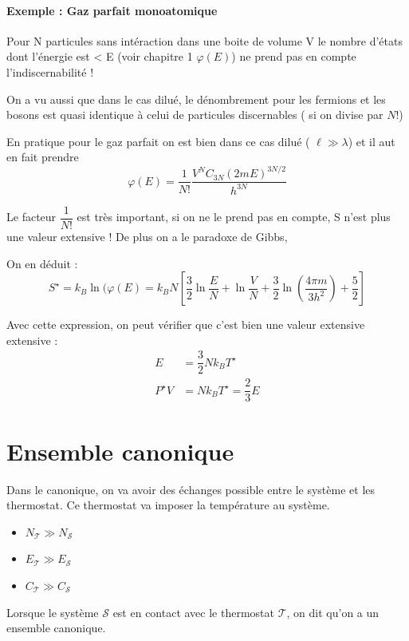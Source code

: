 \documentclass[12pt,a4paper]{report}
\begin{document}
\subsubsection{Exemple : Gaz parfait monoatomique}

Pour N particules sans intéraction dans une boite de volume V le nombre d'états dont l'énergie est < E (voir chapitre 1 $ \varphi (E) $) ne prend pas en compte l'indiscernabilité !

On a vu aussi que dans le cas dilué, le dénombrement pour les fermions et les bosons est quasi identique à celui de particules discernables ( si on divise par $ N!$)

En pratique pour le gaz parfait on est bien dans ce cas dilué ( $ \ell \gg \lambda $) et il aut en fait prendre 
\[
	\varphi (E) = \dfrac{1}{N!}\dfrac{V^N C_{3N} (2 m E)^{3N/2}  }{h^{3N}}
\]

Le facteur $\dfrac{1}{N!}$ est très important, si on ne le prend pas en compte, S n'est plus une valeur extensive ! De plus on a le paradoxe de Gibbs,

On en déduit :
\[
	S^\star = k_B \ln(\varphi(E) = k_B N \left[ \dfrac{3}{2} \ln\dfrac{E}{N} + \ln \dfrac{V}{N} + \dfrac{3}{2} \ln \left( \dfrac{4\pi m}{3h^2} \right) + \dfrac{5}{2} \right]
\]

Avec cette expression, on peut vérifier que c'est bien une valeur extensive extensive :
\begin{align*}
	E &= \dfrac{3}{2} N k_B T^\star\\
	P^\star V &= N k_B T^\star = \dfrac{2}{3} E
\end{align*}

\chapter{Ensemble canonique}

Dans le canonique, on va avoir des échanges possible entre le système et les thermostat. Ce thermostat va imposer la température au système.

\begin{itemize}
	\item $N_\mathcal{T} \gg N_\mathcal{S}$
	\item $E_\mathcal{T} \gg E_\mathcal{S}$
	\item $C_\mathcal{T} \gg C_\mathcal{S}$ 
\end{itemize}

Lorsque le système $\mathcal{S}$ est en contact avec le thermostat $\mathcal{T}$, on dit qu'on a un ensemble canonique.
\end{document}
